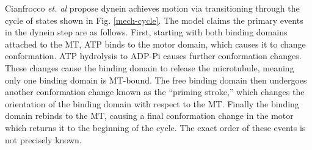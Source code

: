 \documentclass[
11pt, %
english, %
singlespacing, %
headsepline, %
chapterinoneline, %
]{MastersDoctoralThesis} %
\begin{document}
Cianfrocco \textit{et. al} \cite{cianfroccoreview} propose dynein achieves motion via transitioning through the cycle of states shown in Fig. \ref{mech-cycle}. The model claims the primary events in the dynein step are as follows. First, starting with both binding domains attached to the MT, ATP binds to the motor domain, which causes it to change conformation. ATP hydrolysis to ADP-Pi causes further conformation changes. These changes cause the binding domain to release the microtubule, meaning only one binding domain is MT-bound. The free binding domain then undergoes another conformation change known as the ``priming stroke,'' which changes the orientation of the binding domain with respect to the MT. Finally the binding domain rebinds to the MT, causing a final conformation change in the motor which returns it to the beginning of the cycle. The exact order of these events is not precisely known.\\
\end{document}
